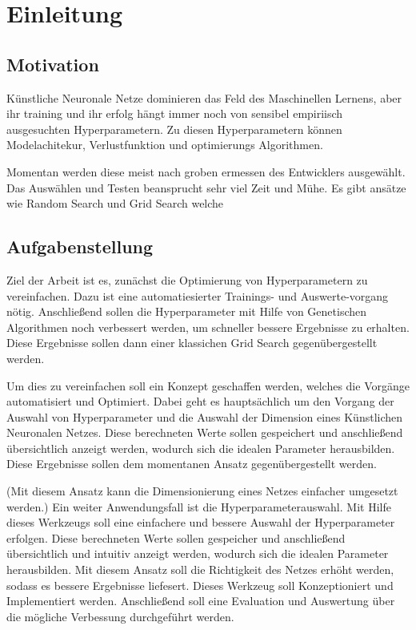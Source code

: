 \section{Einleitung}

\subsection{Motivation}
\label{sec:Motivation}

Künstliche Neuronale Netze dominieren das Feld des Maschinellen Lernens, aber ihr training und ihr erfolg hängt immer noch von sensibel empiriisch ausgesuchten  Hyperparametern. Zu diesen Hyperparametern können Modelachitekur, Verlustfunktion und optimierungs Algorithmen. \cite{pbt}

Momentan werden diese meist nach groben ermessen des Entwicklers ausgewählt. Das Auswählen und Testen beansprucht sehr viel Zeit und Mühe. Es gibt ansätze wie Random Search und Grid Search welche 


\subsection{Aufgabenstellung}
\label{sec:Aufgabenstellung}
Ziel der Arbeit ist es, zunächst die Optimierung von Hyperparametern zu vereinfachen. Dazu ist eine automatiesierter Trainings- und Auswerte-vorgang nötig. Anschließend sollen die Hyperparameter mit Hilfe von Genetischen Algorithmen noch verbessert werden, um schneller bessere Ergebnisse zu erhalten. Diese Ergebnisse sollen dann einer klassichen Grid Search gegenübergestellt werden.

Um dies zu vereinfachen soll ein Konzept geschaffen werden, welches die Vorgänge automatisiert und Optimiert. Dabei geht es hauptsächlich um den Vorgang der Auswahl von Hyperparameter und die Auswahl der Dimension eines Künstlichen Neuronalen Netzes. Diese berechneten Werte sollen gespeichert und anschließend übersichtlich anzeigt werden, wodurch sich die idealen Parameter herausbilden. Diese Ergebnisse sollen dem momentanen Ansatz gegenübergestellt werden. 


(Mit diesem Ansatz kann die Dimensionierung eines Netzes einfacher umgesetzt werden.) Ein weiter Anwendungsfall ist die Hyperparameterauswahl. Mit Hilfe dieses Werkzeugs soll eine einfachere und bessere Auswahl der Hyperparameter erfolgen. Diese berechneten Werte sollen gespeicher und anschließend übersichtlich und intuitiv anzeigt werden, wodurch sich die idealen Parameter herausbilden. Mit diesem Ansatz soll  die Richtigkeit des Netzes erhöht werden, sodass es bessere Ergebnisse liefesert. Dieses Werkzeug soll Konzeptioniert und Implementiert werden. Anschließend soll eine Evaluation und Auswertung über die mögliche Verbessung durchgeführt werden. 



